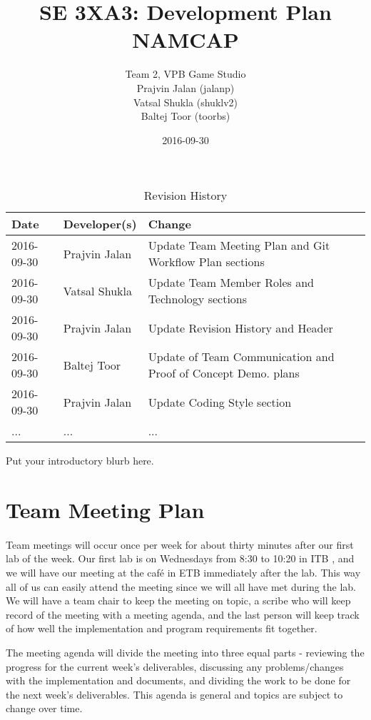 \documentclass{article}
\title{SE 3XA3: Development Plan\\NAMCAP}
\author{Team 2, VPB Game Studio
		\\ Prajvin Jalan (jalanp)
		\\ Vatsal Shukla (shuklv2)
		\\ Baltej Toor (toorbs)
}
\date{2016-09-30}
\begin{document}
\begin{table}[hp]
\caption{Revision History} \label{TblRevisionHistory}
\begin{tabularx}{\textwidth}{llX}
\toprule
\textbf{Date} & \textbf{Developer(s)} & \textbf{Change}\\
\midrule
2016-09-30 & Prajvin Jalan & Update Team Meeting Plan and Git Workflow Plan sections\\
2016-09-30 & Vatsal Shukla & Update Team Member Roles and Technology sections \\
2016-09-30 & Prajvin Jalan & Update Revision History and Header\\
2016-09-30 & Baltej Toor & Update of Team Communication and Proof of Concept Demo. plans\\
2016-09-30 & Prajvin Jalan & Update Coding Style section\\
... & ... & ...\\
\bottomrule
\end{tabularx}
\end{table}

\newpage

\maketitle

Put your introductory blurb here.

\section{Team Meeting Plan}

\paragraph{}
Team meetings will occur once per week for about thirty minutes after our first lab of the week. Our first lab is on Wednesdays from 8:30 to 10:20 in ITB , and we will have our meeting at the café in ETB immediately after the lab. This way all of us can easily attend the meeting since we will all have met during the lab. We will have a team chair to keep the meeting on topic, a scribe who will keep record of the meeting with a meeting agenda, and the last person will keep track of how well the implementation and program requirements fit together.\par The meeting agenda will divide the meeting into three equal parts - reviewing the progress for the current week's deliverables, discussing any problems/changes with the implementation and documents, and dividing the work to be done for the next week's deliverables. This agenda is general and topics are subject to change over time.
\end{document}
